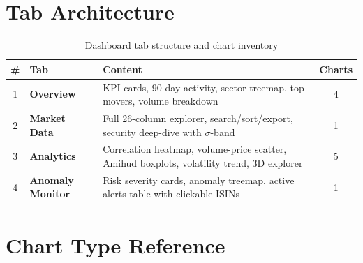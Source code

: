 \documentclass[
  11pt,
  a4paper,
  twoside,
  openany
]{report}
\begin{document}
\section{Tab Architecture}

\begin{table}[H]
\centering
\caption{Dashboard tab structure and chart inventory}
\label{tab:dashboard-tabs}
\begin{tabularx}{\textwidth}{c >{\bfseries}l X c}
\toprule
\textbf{\#} & \textbf{Tab} & \textbf{Content} & \textbf{Charts} \\
\midrule
1 & Overview       & KPI cards, 90-day activity, sector treemap, top movers, volume breakdown & 4 \\
2 & Market Data    & Full 26-column explorer, search/sort/export, security deep-dive with $\sigma$-band & 1 \\
3 & Analytics      & Correlation heatmap, volume-price scatter, Amihud boxplots, volatility trend, 3D explorer & 5 \\
4 & Anomaly Monitor & Risk severity cards, anomaly treemap, active alerts table with clickable ISINs & 1 \\
\bottomrule
\end{tabularx}
\end{table}

\section{Chart Type Reference}
\end{document}
